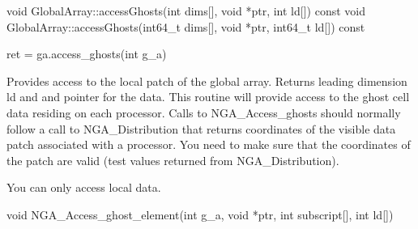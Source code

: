 \documentclass[10pt]{article}
\begin{document}
\begin{cxxapi}
\begin{cxxcode}
void GlobalArray::accessGhosts(int dims[], void *ptr, int ld[]) const
void GlobalArray::accessGhosts(int64_t dims[], void *ptr, int64_t ld[]) const
\end{cxxcode}
\begin{funcargs}
\end{funcargs}
\end{cxxapi}

\begin{pyapi}
\begin{pycode}
ret = ga.access_ghosts(int g_a)
\end{pycode}
\begin{funcargs}
\end{funcargs}
\end{pyapi}

\local

\begin{desc}

Provides access to the local patch of the global array. Returns leading
dimension ld and and pointer for the data.  This routine will provide access to
the ghost cell data residing on each processor. Calls to NGA_Access_ghosts
should normally follow a call to NGA_Distribution that returns coordinates of
the visible data patch associated with a processor. You need to make sure that
the coordinates of the patch are valid (test values returned from
NGA_Distribution).

You can only access local data.

\end{desc}



\begin{capi}
\begin{ccode}
void NGA_Access_ghost_element(int g_a, void *ptr, int subscript[],
                              int ld[])
\end{ccode}
\begin{funcargs}
\end{funcargs}
\end{capi}
\end{document}
